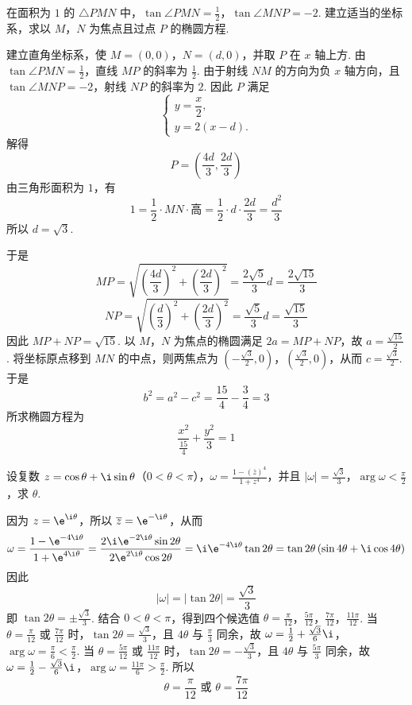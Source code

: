 \begin{problem}
在面积为 \(1\) 的 \(\triangle PMN\) 中，\(\tan \angle PMN=\frac{1}{2}\)，\(\tan \angle MNP=-2\). 建立适当的坐标系，求以 \(M\)，\(N\) 为焦点且过点 \(P\) 的椭圆方程.
\end{problem}

\begin{solution}
建立直角坐标系，使 \(M=(0,0)\)，\(N=(d,0)\)，并取 \(P\) 在 \(x\) 轴上方. 由 \(\tan\angle PMN=\frac12\)，直线 \(MP\) 的斜率为 \(\frac12\). 由于射线 \(NM\) 的方向为负 \(x\) 轴方向，且 \(\tan\angle MNP=-2\)，射线 \(NP\) 的斜率为 \(2\). 因此 \(P\) 满足
\[
\begin{cases}
y=\dfrac{x}{2},\\
y=2(x-d).
\end{cases}
\]
解得
\[
P=\left(\frac{4d}{3},\frac{2d}{3}\right)
\]
由三角形面积为 \(1\)，有
\[
1=\frac12\cdot MN\cdot\text{高}=\frac12\cdot d\cdot\frac{2d}{3}=\frac{d^2}{3}
\]
所以 \(d=\sqrt3\).

于是
\[
MP=\sqrt{\left(\frac{4d}{3}\right)^2+\left(\frac{2d}{3}\right)^2}=\frac{2\sqrt5}{3}d=\frac{2\sqrt{15}}{3}
\]
\[
NP=\sqrt{\left(\frac{d}{3}\right)^2+\left(\frac{2d}{3}\right)^2}=\frac{\sqrt5}{3}d=\frac{\sqrt{15}}{3}
\]
因此 \(MP+NP=\sqrt{15}\). 以 \(M\)，\(N\) 为焦点的椭圆满足 \(2a=MP+NP\)，故 \(a=\frac{\sqrt{15}}{2}\). 将坐标原点移到 \(MN\) 的中点，则两焦点为 \(\left(-\frac{\sqrt3}{2},0\right)\)，\(\left(\frac{\sqrt3}{2},0\right)\)，从而 \(c=\frac{\sqrt3}{2}\). 于是
\[
b^2=a^2-c^2=\frac{15}{4}-\frac{3}{4}=3
\]
所求椭圆方程为
\[
\boxed{\frac{x^2}{\frac{15}{4}}+\frac{y^2}{3}=1}
\]
\end{solution}

\begin{problem}
设复数 \(z=\cos\theta+\i\sin\theta\)（\(0<\theta<\pi\)），\(\omega=\frac{1-\left(\overline{z}\right)^4}{1+z^4}\)，并且 \(|\omega|=\frac{\sqrt{3}}{3}\)，\(\arg \omega<\frac{\pi}{2}\)，求 \(\theta\).
\end{problem}

\begin{solution}
因为 \(z=\e^{\i\theta}\)，所以 \(\overline z=\e^{-\i\theta}\)，从而
\[
\omega=\frac{1-\e^{-4\i\theta}}{1+\e^{4\i\theta}}
=\frac{2\i\e^{-2\i\theta}\sin2\theta}{2\e^{2\i\theta}\cos2\theta}
=\i\e^{-4\i\theta}\tan2\theta
=\tan2\theta\left(\sin4\theta+\i\cos4\theta\right)
\]
因此
\[
|\omega|=|\tan2\theta|=\frac{\sqrt3}{3}
\]
即 \(\tan2\theta=\pm\frac{\sqrt3}{3}\). 结合 \(0<\theta<\pi\)，得到四个候选值
\(\theta=\frac{\pi}{12}\)，\(\frac{5\pi}{12}\)，\(\frac{7\pi}{12}\)，\(\frac{11\pi}{12}\).
当 \(\theta=\frac{\pi}{12}\) 或 \(\frac{7\pi}{12}\) 时，\(\tan2\theta=\frac{\sqrt3}{3}\)，且 \(4\theta\) 与 \(\frac{\pi}{3}\) 同余，故
\(\omega=\frac12+\frac{\sqrt3}{6}\i\)，\(\arg\omega=\frac{\pi}{6}<\frac{\pi}{2}\).
当 \(\theta=\frac{5\pi}{12}\) 或 \(\frac{11\pi}{12}\) 时，\(\tan2\theta=-\frac{\sqrt3}{3}\)，且 \(4\theta\) 与 \(\frac{5\pi}{3}\) 同余，故
\(\omega=\frac12-\frac{\sqrt3}{6}\i\)，\(\arg\omega=\frac{11\pi}{6}>\frac{\pi}{2}\).
所以
\[
\boxed{\theta=\frac{\pi}{12}\text{ 或 }\theta=\frac{7\pi}{12}}
\]
\end{solution}
